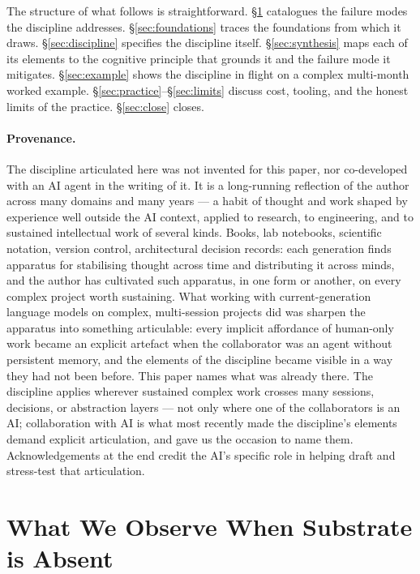\documentclass[11pt,a4paper,twocolumn]{article}
\begin{document}
The structure of what follows is straightforward.
\S\ref{sec:failures} catalogues the failure modes the discipline
addresses. \S\ref{sec:foundations} traces the foundations from which
it draws. \S\ref{sec:discipline} specifies the discipline itself.
\S\ref{sec:synthesis} maps each of its elements to the cognitive
principle that grounds it and the failure mode it mitigates.
\S\ref{sec:example} shows the discipline in flight on a complex
multi-month worked example. \S\ref{sec:practice}--\S\ref{sec:limits}
discuss cost, tooling, and the honest limits of the practice.
\S\ref{sec:close} closes.

\paragraph{Provenance.} The discipline articulated here was not
invented for this paper, nor co-developed with an AI agent in the
writing of it. It is a long-running reflection of the author
across many domains and many years --- a habit of thought and
work shaped by experience well outside the AI context, applied to
research, to engineering, and to sustained intellectual work of
several kinds. Books, lab notebooks, scientific notation, version
control, architectural decision records: each generation finds
apparatus for stabilising thought across time and distributing it
across minds, and the author has cultivated such apparatus, in
one form or another, on every complex project worth sustaining.
What working with current-generation language models on complex,
multi-session projects did was sharpen the apparatus into
something articulable: every implicit affordance of human-only
work became an explicit artefact when the collaborator was an
agent without persistent memory, and the elements of the
discipline became visible in a way they had not been before. This
paper names what was already there. The discipline applies
wherever sustained complex work crosses many sessions, decisions,
or abstraction layers --- not only where one of the collaborators
is an AI; collaboration with AI is what most recently made the
discipline's elements demand explicit articulation, and gave us
the occasion to name them. Acknowledgements at the end credit the
AI's specific role in helping draft and stress-test that
articulation.

\section{What We Observe When Substrate is Absent}
\label{sec:failures}
\end{document}

